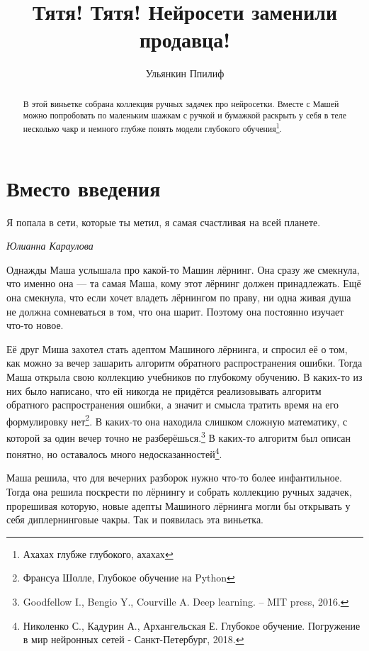 \documentclass[12pt, a4paper, oneside]{article}
\title{Тятя! Тятя! Нейросети заменили продавца!}
\date{ }
\author{Ульянкин Ппилиф}
\begin{document}
\toggletrue{lecture}

\maketitle

	
\begin{abstract}
    В этой виньетке собрана коллекция ручных задачек про нейросетки. Вместе с Машей можно попробовать по маленьким шажкам с ручкой и бумажкой раскрыть у себя в теле несколько чакр и немного глубже понять модели глубокого обучения\footnote{Ахахах глубже глубокого, ахахах}.
\end{abstract}

\section*{Вместо введения}

\epigraph{Я попала в сети, которые ты метил, я самая счастливая на всей планете.}{\textit{Юлианна Караулова}}

    Однажды Маша услышала про какой-то Машин лёрнинг. Она сразу же смекнула, что именно она --- та самая Маша, кому этот лёрнинг должен принадлежать. Ещё она смекнула, что если хочет владеть лёрнингом по праву, ни одна живая душа не должна сомневаться в том, что она шарит. Поэтому она постоянно изучает что-то новое. 
    
    Её друг Миша захотел стать адептом Машиного лёрнинга, и спросил её о том, как можно за вечер зашарить алгоритм обратного распространения ошибки. Тогда Маша открыла свою коллекцию учебников по глубокому обучению. В каких-то из них было написано, что ей никогда не придётся реализовывать алгоритм обратного распространения ошибки, а значит и смысла тратить время на его формулировку нет\footnote{Франсуа Шолле, Глубокое обучение на Python}. В каких-то она находила слишком сложную математику, с которой за один вечер точно не разберёшься.\footnote{Goodfellow I., Bengio Y., Courville A. Deep learning. – MIT press, 2016.} В каких-то алгоритм был описан понятно, но оставалось много недосказанностей\footnote{Николенко С., Кадурин А., Архангельская Е. Глубокое обучение. Погружение в мир нейронных сетей - Санкт-Петербург, 2018.}. 
    
    Маша решила, что для вечерних разборок нужно что-то более инфантильное. Тогда она решила поскрести по лёрнингу и собрать коллекцию ручных задачек, прорешивая которую, новые адепты Машиного лёрнинга могли бы открывать у себя диплернинговые чакры. Так и появилась эта виньетка.  
	
\end{document}
